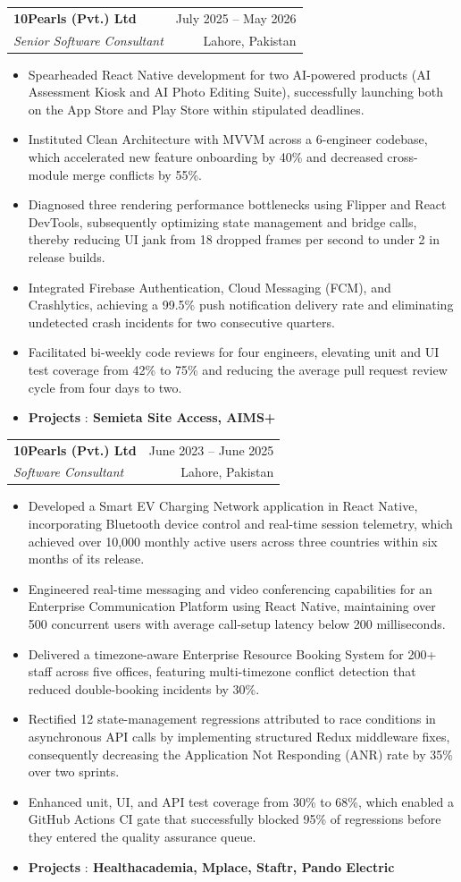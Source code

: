 \documentclass[letterpaper,11pt]{article}
\makeatletter
\newcommand{\resumeItem}[1]{
  \item\small{
    {#1 \vspace{-1pt}}
  }
}
\newcommand{\resumeSubheading}[4]{
  \vspace{-1pt}\item
    \begin{tabular*}{\textwidth}[t]{l@{\extracolsep{\fill}}r}
      \textbf{#1} & {\color{dark-grey}\small #2}\vspace{1pt}\\ %
      \textit{#3} & {\color{dark-grey} \small #4}\\ %
    \end{tabular*}\vspace{-4pt}
}
\newcommand{\resumeItemListStart}{\begin{itemize}}
\newcommand{\resumeItemListEnd}{\end{itemize}\vspace{0pt}}
\makeatother
\begin{document}
    \resumeSubheading
      {10Pearls (Pvt.) Ltd}{July 2025 -- May 2026}
      {Senior Software Consultant}{Lahore, Pakistan}
      \resumeItemListStart
        \resumeItem{Spearheaded React Native development for two AI-powered products (AI Assessment Kiosk and AI Photo Editing Suite), successfully launching both on the App Store and Play Store within stipulated deadlines.}
        \resumeItem{Instituted Clean Architecture with MVVM across a 6-engineer codebase, which accelerated new feature onboarding by 40\% and decreased cross-module merge conflicts by 55\%.}
        \resumeItem{Diagnosed three rendering performance bottlenecks using Flipper and React DevTools, subsequently optimizing state management and bridge calls, thereby reducing UI jank from 18 dropped frames per second to under 2 in release builds.}
        \resumeItem{Integrated Firebase Authentication, Cloud Messaging (FCM), and Crashlytics, achieving a 99.5\% push notification delivery rate and eliminating undetected crash incidents for two consecutive quarters.}
        \resumeItem{Facilitated bi-weekly code reviews for four engineers, elevating unit and UI test coverage from 42\% to 75\% and reducing the average pull request review cycle from four days to two.}
        \resumeItem{ {\bfseries Projects} {:}\bfseries{ Semieta Site Access, AIMS+ }\vspace{2pt} \\}
      \resumeItemListEnd

    \resumeSubheading
      {10Pearls (Pvt.) Ltd}{June 2023 -- June 2025}
      {Software Consultant}{Lahore, Pakistan}
      \resumeItemListStart
        \resumeItem{Developed a Smart EV Charging Network application in React Native, incorporating Bluetooth device control and real-time session telemetry, which achieved over 10,000 monthly active users across three countries within six months of its release.}
        \resumeItem{Engineered real-time messaging and video conferencing capabilities for an Enterprise Communication Platform using React Native, maintaining over 500 concurrent users with average call-setup latency below 200 milliseconds.}
        \resumeItem{Delivered a timezone-aware Enterprise Resource Booking System for 200+ staff across five offices, featuring multi-timezone conflict detection that reduced double-booking incidents by 30\%.}
        \resumeItem{Rectified 12 state-management regressions attributed to race conditions in asynchronous API calls by implementing structured Redux middleware fixes, consequently decreasing the Application Not Responding (ANR) rate by 35\% over two sprints.}
        \resumeItem{Enhanced unit, UI, and API test coverage from 30\% to 68\%, which enabled a GitHub Actions CI gate that successfully blocked 95\% of regressions before they entered the quality assurance queue.}
        \resumeItem{ {\bfseries Projects} {:}\bfseries{ Healthacademia, Mplace, Staftr, Pando Electric }\vspace{2pt} \\}
      \resumeItemListEnd
\end{document}
